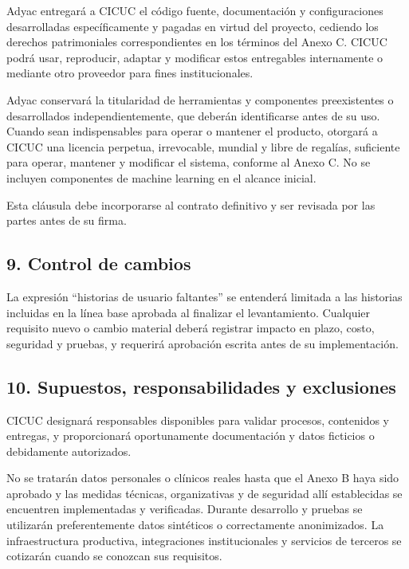 \documentclass[
]{article}
\begin{document}
Adyac entregará a CICUC el código fuente, documentación y
configuraciones desarrolladas específicamente y pagadas en virtud del
proyecto, cediendo los derechos patrimoniales correspondientes en los
términos del Anexo C. CICUC podrá usar, reproducir, adaptar y modificar
estos entregables internamente o mediante otro proveedor para fines
institucionales.

Adyac conservará la titularidad de herramientas y componentes
preexistentes o desarrollados independientemente, que deberán
identificarse antes de su uso. Cuando sean indispensables para operar o
mantener el producto, otorgará a CICUC una licencia perpetua,
irrevocable, mundial y libre de regalías, suficiente para operar,
mantener y modificar el sistema, conforme al Anexo C. No se incluyen
componentes de machine learning en el alcance inicial.

Esta cláusula debe incorporarse al contrato definitivo y ser revisada
por las partes antes de su firma.

\hypertarget{9-control-de-cambios}{%
\subsection{9. Control de cambios}\label{9-control-de-cambios}}

La expresión ``historias de usuario faltantes'' se entenderá limitada a
las historias incluidas en la línea base aprobada al finalizar el
levantamiento. Cualquier requisito nuevo o cambio material deberá
registrar impacto en plazo, costo, seguridad y pruebas, y requerirá
aprobación escrita antes de su implementación.

\hypertarget{10-supuestos-responsabilidades-y-exclusiones}{%
\subsection{10. Supuestos, responsabilidades y
exclusiones}\label{10-supuestos-responsabilidades-y-exclusiones}}

CICUC designará responsables disponibles para validar procesos,
contenidos y entregas, y proporcionará oportunamente documentación y
datos ficticios o debidamente autorizados.

No se tratarán datos personales o clínicos reales hasta que el Anexo B
haya sido aprobado y las medidas técnicas, organizativas y de seguridad
allí establecidas se encuentren implementadas y verificadas. Durante
desarrollo y pruebas se utilizarán preferentemente datos sintéticos o
correctamente anonimizados. La infraestructura productiva, integraciones
institucionales y servicios de terceros se cotizarán cuando se conozcan
sus requisitos.
\end{document}

